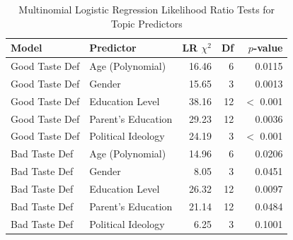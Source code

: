 \begin{table}[htpb]
\centering
\begin{tabular}{llrrr}
\toprule
Model & Predictor & LR $\chi^2$ & Df & $p$-value \\
\midrule
Good Taste Def & Age (Polynomial) & 16.46 & 6 & 0.0115 \\
Good Taste Def & Gender & 15.65 & 3 & 0.0013 \\
Good Taste Def & Education Level & 38.16 & 12 & $<$ 0.001 \\
Good Taste Def & Parent's Education & 29.23 & 12 & 0.0036 \\
Good Taste Def & Political Ideology & 24.19 & 3 & $<$ 0.001 \\
Bad Taste Def & Age (Polynomial) & 14.96 & 6 & 0.0206 \\
Bad Taste Def & Gender & 8.05 & 3 & 0.0451 \\
Bad Taste Def & Education Level & 26.32 & 12 & 0.0097 \\
Bad Taste Def & Parent's Education & 21.14 & 12 & 0.0484 \\
Bad Taste Def & Political Ideology & 6.25 & 3 & 0.1001 \\
\bottomrule
\end{tabular}
\caption{Multinomial Logistic Regression Likelihood Ratio Tests for Topic Predictors}
\label{tab:wald_models}
\end{table}

